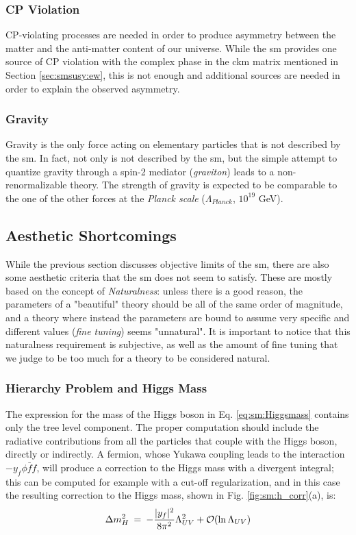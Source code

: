 \subsubsection*{CP Violation}

CP-violating processes are needed in order to produce asymmetry between the matter and the anti-matter content of our universe. While the \gls{sm} provides one source of CP violation with the complex phase in the \gls{ckm} matrix mentioned in Section \ref{sec:smsusy:ew}, this is not enough and additional sources are needed in order to explain the observed asymmetry.

\subsubsection*{Gravity}

Gravity is the only force acting on elementary particles that is not described by the \gls{sm}. In fact, not only is not described by the \gls{sm}, but the simple attempt to quantize gravity through a spin-2  mediator (\textit{graviton}) leads to a non-renormalizable theory. The strength of gravity is expected to be comparable to the one of the other forces at the \textit{Planck scale} ($\Lambda_{Planck}$, $10^{19}$ GeV). 

\subsection{Aesthetic Shortcomings}
\label{sec:sm:aesthetics}

While the previous section discusses objective limits of the \gls{sm}, there are also some aesthetic criteria that the \gls{sm} does not seem to satisfy. These are mostly based on the concept of \textit{Naturalness}: unless there is a good reason, the parameters of a "beautiful" theory should be all of the same order of magnitude, and a theory where instead the parameters are bound to assume very specific and different values (\textit{fine tuning}) seems "unnatural". It is important to notice that this naturalness requirement is subjective, as well as the amount of fine tuning that we judge to be too much for a theory to be considered natural.


\subsubsection*{Hierarchy Problem and Higgs Mass}

The expression for the mass of the Higgs boson in Eq. \ref{eq:sm:Higgsmass} contains only the tree level component. The proper computation should include the radiative contributions from all the particles that couple with the Higgs boson, directly or indirectly. A fermion, whose Yukawa coupling leads to the interaction $-y_f \phi \bar{f} f$, will produce a correction to the Higgs mass with a divergent integral; this can be computed for example with a cut-off regularization, and in this case the resulting correction to the Higgs mass, shown in Fig. \ref{fig:sm:h_corr}(a), is:
\begin{equation}
\Delta m_H^2 \>=\>  
-{|y_f|^2\over 8 \pi^2} \Lambda_{UV}^2 + \mathcal{O}(\ln \Lambda_{UV} )
\label{eq:divhf}
\end{equation}

